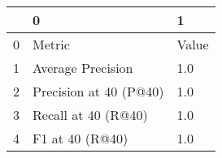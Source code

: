 \begin{tabular}{lll}
\toprule
{} &                       0 &      1 \\
\midrule
0 &                  Metric &  Value \\
1 &       Average Precision &    1.0 \\
2 &  Precision at 40 (P@40) &    1.0 \\
3 &     Recall at 40 (R@40) &    1.0 \\
4 &         F1 at 40 (R@40) &    1.0 \\
\bottomrule
\end{tabular}
